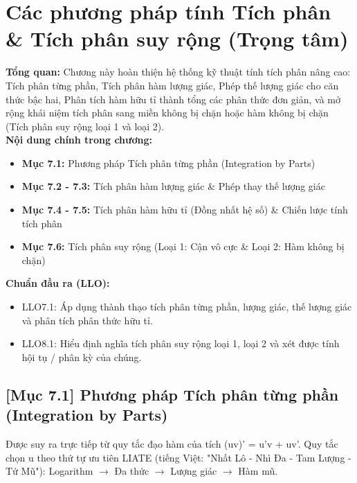 \documentclass[11pt,a4paper,oneside]{book}
\begin{document}
\chapter{Các phương pháp tính Tích phân \& Tích phân suy rộng (Trọng tâm)}
\label{chap:chuong-7}

\begin{tcolorbox}[colback=slate!5!white,colframe=slate!75!black,title={\textbf{Mục lục Chương 7 \& Chuẩn đầu ra (Buổi 7 - 8)}}]
\textbf{Tổng quan:} Chương này hoàn thiện hệ thống kỹ thuật tính tích phân nâng cao: Tích phân từng phần, Tích phân hàm lượng giác, Phép thế lượng giác cho căn thức bậc hai, Phân tích hàm hữu tỉ thành tổng các phân thức đơn giản, và mở rộng khái niệm tích phân sang miền không bị chặn hoặc hàm không bị chặn (Tích phân suy rộng loại 1 và loại 2).\\[6pt]
\textbf{Nội dung chính trong chương:}
\begin{itemize}[leftmargin=1.5em, itemsep=2pt]
  \item \textbf{Mục 7.1:} Phương pháp Tích phân từng phần (Integration by Parts)
  \item \textbf{Mục 7.2 - 7.3:} Tích phân hàm lượng giác \& Phép thay thế lượng giác
  \item \textbf{Mục 7.4 - 7.5:} Tích phân hàm hữu tỉ (Đồng nhất hệ số) \& Chiến lược tính tích phân
  \item \textbf{Mục 7.6:} Tích phân suy rộng (Loại 1: Cận vô cực \& Loại 2: Hàm không bị chặn)
\end{itemize}
\textbf{Chuẩn đầu ra (LLO):}
\begin{itemize}[leftmargin=1.5em, itemsep=2pt]
  \item LLO7.1: Áp dụng thành thạo tích phân từng phần, lượng giác, thế lượng giác và phân tích phân thức hữu tỉ.
  \item LLO8.1: Hiểu định nghĩa tích phân suy rộng loại 1, loại 2 và xét được tính hội tụ / phân kỳ của chúng.
\end{itemize}
\end{tcolorbox}

\section{[Mục 7.1] Phương pháp Tích phân từng phần (Integration by Parts)}
Được suy ra trực tiếp từ quy tắc đạo hàm của tích (uv)' = u'v + uv'. Quy tắc chọn u theo thứ tự ưu tiên LIATE (tiếng Việt: "Nhất Lô - Nhì Đa - Tam Lượng - Tứ Mũ"): Logarithm $\to$  Đa thức $\to$  Lượng giác $\to$  Hàm mũ.
\end{document}
